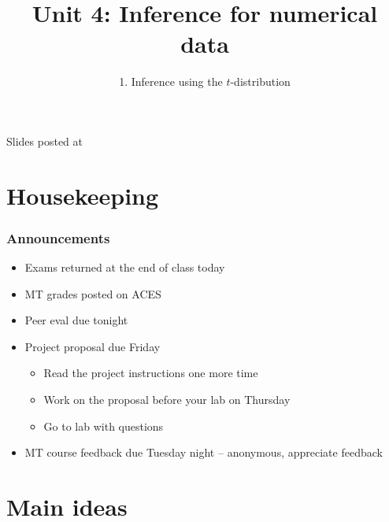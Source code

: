 \documentclass[11pt,containsverbatim,handout,xcolor=xelatex,dvipsnames,table]{beamer}
\title{Unit 4: Inference for numerical data}
\subtitle{1. Inference using the $t$-distribution}
\author{\CourseName}
\date{}
\institute{\InstituteName}
\begin{document}



\begin{frame}[plain]

\titlepage

\vfill

{\scriptsize {} \hfill Slides posted at  \webURL{\CourseSite}}

\addtocounter{framenumber}{-1} 

\end{frame}


\section{Housekeeping}


\begin{frame}
\frametitle{Announcements}

\begin{itemize}

\item Exams returned at the end of class today

\item MT grades posted on ACES

\item Peer eval due tonight

\item Project proposal due Friday
\begin{itemize}
\item Read the project instructions one more time
\item Work on the proposal before your lab on Thursday
\item Go to lab with questions
\end{itemize}

\item MT course feedback due Tuesday night -- anonymous, appreciate feedback

\end{itemize}

\end{frame}


\section{Main ideas}
\end{document}
